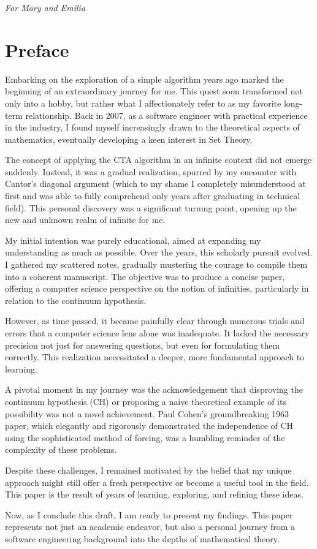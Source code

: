 \pagebreak
\hspace*{\fill}\textit{For Mary and Emilia}

\pagebreak
\section{Preface}

Embarking on the exploration of a simple algorithm years ago marked the beginning of an extraordinary journey for me. This quest soon transformed not only into a hobby, but rather what I affectionately refer to as my favorite long-term relationship. Back in 2007, as a software engineer with practical experience in the industry, I found myself increasingly drawn to the theoretical aspects of mathematics, eventually developing a keen interest in Set Theory.

The concept of applying the CTA algorithm in an infinite context did not emerge suddenly. Instead, it was a gradual realization, spurred by my encounter with Cantor's diagonal argument (which to my shame I completely misunderstood at first and was able to fully comprehend only years after graduating in technical field). This personal discovery was a significant turning point, opening up the new and unknown realm of infinite for me. 

My initial intention was purely educational, aimed at expanding my understanding as much as possible. Over the years, this scholarly pursuit evolved. I gathered my scattered notes, gradually mustering the courage to compile them into a coherent manuscript. The objective was to produce a concise paper, offering a computer science perspective on the notion of infinities, particularly in relation to the continuum hypothesis.

However, as time passed, it became painfully clear through numerous trials and errors that a computer science lens alone was inadequate. It lacked the necessary precision not just for answering questions, but even for formulating them correctly. This realization necessitated a deeper, more fundamental approach to learning.

A pivotal moment in my journey was the acknowledgement that disproving the continuum hypothesis (CH) or proposing a naive theoretical example of its possibility was not a novel achievement. Paul Cohen's groundbreaking 1963 paper, which elegantly and rigorously demonstrated the independence of CH using the sophisticated method of forcing, was a humbling reminder of the complexity of these problems.

Despite these challenges, I remained motivated by the belief that my unique approach might still offer a fresh perspective or become a useful tool in the field. This paper is the result of years of learning, exploring, and refining these ideas.

Now, as I conclude this draft, I am ready to present my findings. This paper represents not just an academic endeavor, but also a personal journey from a software engineering background into the depths of mathematical theory.
